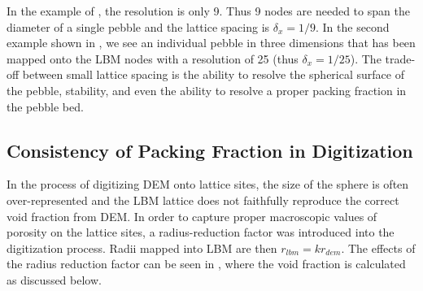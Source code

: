 In the example of , the resolution is only 9. Thus 9 nodes are needed to span the diameter of a single pebble and the lattice spacing is $\delta_x = 1/9$. In the second example shown in , we see an individual pebble in three dimensions that has been mapped onto the LBM nodes with a resolution of 25 (thus $\delta_x = 1/25$). The trade-off between small lattice spacing is the ability to resolve the spherical surface of the pebble, stability, and even the ability to resolve a proper packing fraction in the pebble bed. 







\FloatBarrier
\subsection{Consistency of Packing Fraction in Digitization}
In the process of digitizing DEM onto lattice sites, the size of the sphere is often over-represented and the LBM lattice does not faithfully reproduce the correct void fraction from DEM. In order to capture proper macroscopic values of porosity on the lattice sites, a radius-reduction factor was introduced into the digitization process. Radii mapped into LBM are then $r_{lbm} = k r_{dem}$. The effects of the radius reduction factor can be seen in , where the void fraction is calculated as discussed below.

